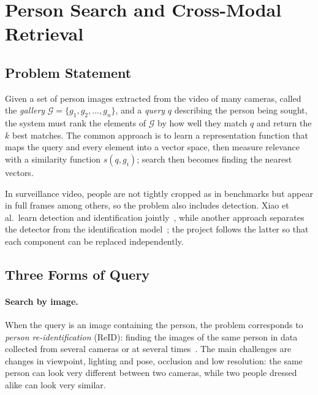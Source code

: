 \section{Person Search and Cross-Modal Retrieval}
\label{sec:3.1}

\subsection{Problem Statement}
\label{sec:3.1.1}

Given a set of person images extracted from the video of many cameras, called the \emph{gallery} $\mathcal{G} = \{g_1, g_2, \ldots, g_n\}$, and a \emph{query} $q$ describing the person being sought, the system must rank the elements of $\mathcal{G}$ by how well they match $q$ and return the $k$ best matches. The common approach is to learn a representation function that maps the query and every element into a vector space, then measure relevance with a similarity function $s(q, g_i)$; search then becomes finding the nearest vectors.

In surveillance video, people are not tightly cropped as in benchmarks but appear in full frames among others, so the problem also includes detection. Xiao et al.\ learn detection and identification jointly~\cite{xiao2017personsearch}, while another approach separates the detector from the identification model~\cite{zheng2017reidwild}; the project follows the latter so that each component can be replaced independently.

\subsection{Three Forms of Query}
\label{sec:3.1.2}
\label{sec:3.1.3}
\label{sec:3.1.4}

\paragraph{Search by image.} When the query is an image containing the person, the problem corresponds to \emph{person re-identification} (ReID): finding the images of the same person in data collected from several cameras or at several times~\cite{ye2022reidsurvey}. The main challenges are changes in viewpoint, lighting and pose, occlusion and low resolution: the same person can look very different between two cameras, while two people dressed alike can look very similar.

